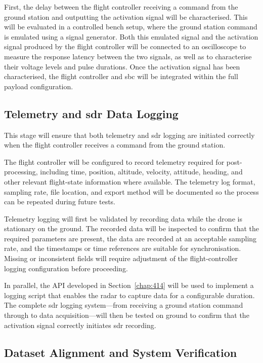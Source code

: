 First, the delay between the flight controller receiving a command from the ground station and outputting the activation signal will be characterised. This will be evaluated in a controlled bench setup, where the ground station command is emulated using a signal generator. Both this emulated signal and the activation signal produced by the flight controller will be connected to an oscilloscope to measure the response latency between the two signals, as well as to characterise their voltage levels and pulse durations. Once the activation signal has been characterised, the flight controller and \gls{sbc} will be integrated within the full payload configuration.

\subsection[Telemetry and SDR Data Logging]{Telemetry and \gls{sdr} Data Logging}

This stage will ensure that both telemetry and \gls{sdr} logging are initiated correctly when the flight controller receives a command from the ground station.

The flight controller will be configured to record telemetry required for post-processing, including time, position, altitude, velocity, attitude, heading, and other relevant flight-state information where available. The telemetry log format, sampling rate, file location, and export method will be documented so the process can be repeated during future tests.

Telemetry logging will first be validated by recording data while the drone is stationary on the ground. The recorded data will be inspected to confirm that the required parameters are present, the data are recorded at an acceptable sampling rate, and the timestamps or time references are suitable for synchronisation. Missing or inconsistent fields will require adjustment of the flight-controller logging configuration before proceeding.

In parallel, the API developed in Section~\ref{chap:414} will be used to implement a logging script that enables the radar to capture data for a configurable duration. The complete \gls{sdr} logging system—from receiving a ground station command through to data acquisition—will then be tested on ground to confirm that the activation signal correctly initiates \gls{sdr} recording.

\subsection{Dataset Alignment and System Verification}

